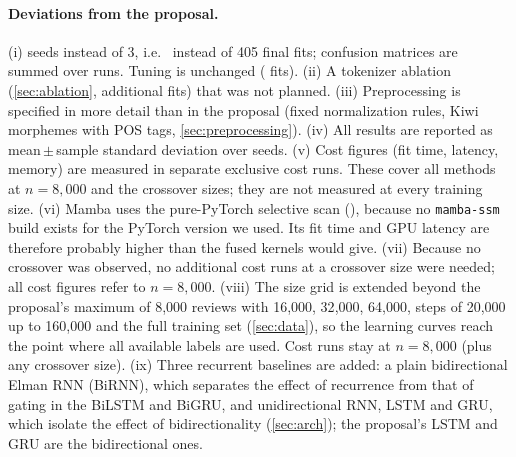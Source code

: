 \paragraph{Deviations from the proposal.}
(i) \nSeeds{} seeds instead of 3, i.e.\ \nFinalFits{} instead of 405 final fits; confusion
matrices are summed over \nSeeds{} runs. Tuning is unchanged (\nTuningFits{} fits).
(ii) A tokenizer ablation (\cref{sec:ablation}, \nAblationFits{} additional fits) that was not
planned. (iii) Preprocessing is specified in more detail than in the proposal (fixed
normalization rules, Kiwi morphemes with POS tags, \cref{sec:preprocessing}).
(iv) All results are reported as mean\,$\pm$\,sample standard deviation over \nSeeds{} seeds.
(v) Cost figures (fit time, latency, memory) are measured in separate exclusive cost runs.
These cover all methods at $n=8{,}000$ and the crossover sizes; they are not measured at every
training size.
(vi) Mamba uses the pure-PyTorch selective scan (\mambaBackend{}), because no
\texttt{mamba-ssm} build exists for the PyTorch version we used. Its fit time and GPU latency are
therefore probably higher than the fused kernels would give.
(vii) Because no crossover was observed, no additional cost runs at a crossover size were
needed; all cost figures refer to $n=8{,}000$.
(viii) The size grid is extended beyond the proposal's maximum of 8{,}000 reviews with
16{,}000, 32{,}000, 64{,}000, steps of 20{,}000 up to 160{,}000 and the full training set
(\cref{sec:data}), so the learning
curves reach the point where all available labels are used. Cost runs stay at
$n=8{,}000$ (plus any crossover size).
(ix) Three recurrent baselines are added: a plain bidirectional Elman RNN (BiRNN), which
separates the effect of recurrence from that of gating in the BiLSTM and BiGRU, and
unidirectional RNN, LSTM and GRU, which isolate the effect of bidirectionality
(\cref{sec:arch}); the proposal's LSTM and GRU are the bidirectional ones.
